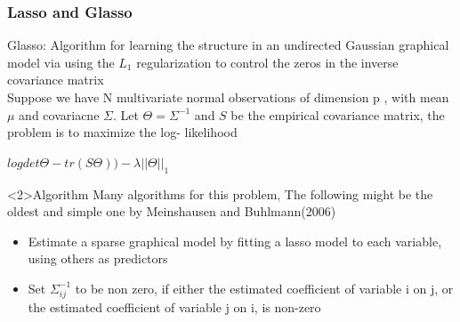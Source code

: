 \documentclass{beamer}
\begin{document}
\begin{frame}
\frametitle{Lasso and Glasso }
  \begin{block}{Glasso:}
    Algorithm for learning the structure in an undirected Gaussian graphical model via using the $L_1$ regularization to control the
    zeros in the inverse covariance matrix\\
    Suppose we have N multivariate normal observations of dimension p , with mean $\mu$ and covariacne $\Sigma$. Let $\Theta=\Sigma^{-1}$ and $S$ be the empirical covariance matrix, the problem is to maximize the log- likelihood \\
    \begin{center}
    $logdet\Theta- tr(S\Theta))-\lambda||\Theta||_1$
  \end{center}
  \end{block}

  \begin{block}<2>{Algorithm}
  Many algorithms for this problem, The following might be the oldest and simple one by Meinshausen and Buhlmann(2006)
    \begin{itemize}
        \item  Estimate a sparse graphical model by fitting a lasso model to each variable, using others as predictors
        \item  Set $\Sigma_{ij}^{-1}$ to be non zero, if either the estimated coefficient of variable i on j, or the
        estimated coefficient of variable j on i, is non-zero
    \end{itemize}
  \end{block}
\end{frame}
\end{document}
